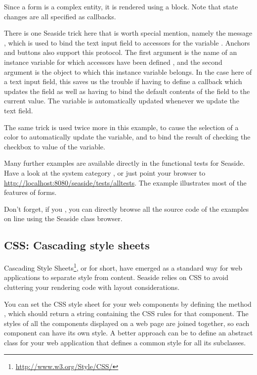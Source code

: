 \documentclass[a4paper,10pt,twoside]{book}
\begin{document}
Since a form is a complex entity, it is rendered using a block. 
Note that state changes are all specified as callbacks.

There is one Seaside trick here that is worth special mention, namely the message , which is used to bind the text input field to accessors for the variable .
Anchors and buttons also support this protocol.
The first argument is the name of an instance variable for which accessors have been defined , and the second argument is the object to which this instance variable belongs.
In the case here of a text input field, this saves us the trouble if having to define a callback which updates the field as well as having to bind the default contents of the field to the current value.
The  variable is automatically updated whenever we update the text field.

The same trick is used twice more in this example, to cause the selection of a color to automatically update the  variable, and to bind the result of checking the checkbox to value of the  variable.

Many further examples are available directly in the functional tests for Seaside.
Have a look at the system category , or just point your browser to \url{http://localhost:8080/seaside/tests/alltests}.
The  example illustrates most of the features of forms.

Don't forget, if you , you can directly browse all the source code of the examples on line using the Seaside class browser.

\subsection{CSS: Cascading style sheets}
\label{sec:css}

Cascading Style Sheets\footnote{\url{http://www.w3.org/Style/CSS/}}, or  for short, have emerged as a standard way for web applications to separate style from content.
Seaside relies on CSS to avoid cluttering your rendering code with layout considerations.

You can set the CSS style sheet for your web components by defining the method , which should return a string containing the CSS rules for that component.
The styles of all the components displayed on a web page are joined together, so each component can have its own style.
A better approach can be to define an abstract class for your web application that defines a common style for all its subclasses.
\end{document}
